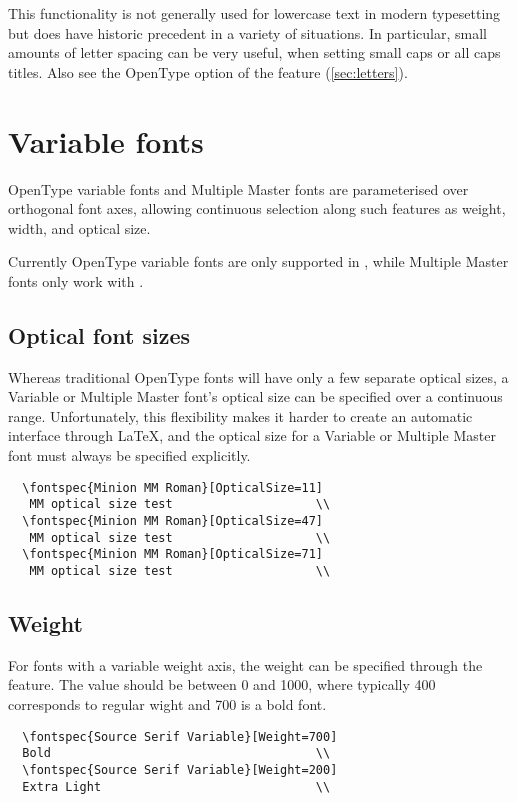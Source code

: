 \documentclass[a4paper]{l3doc}
\begin{document}
This functionality is not generally used for lowercase text in modern typesetting but does have historic precedent in a variety of situations.
In particular, small amounts of letter spacing can be very useful, when setting small caps or all caps titles.
Also see the OpenType  option of the  feature (\vref{sec:letters}).


\section{Variable fonts} \label{sec:variable}

OpenType variable fonts and Multiple Master fonts are parameterised over
orthogonal font axes, allowing continuous selection along such features
as weight, width, and optical size.

Currently OpenType variable fonts are only supported in \LuaTeX, while
Multiple Master fonts only work with \XeTeX.

\subsection{Optical font sizes} \label{sec:aat-opticalsize}
Whereas traditional OpenType fonts will have only a few separate
optical sizes, a Variable or Multiple Master font's optical size can be
specified over a continuous range. Unfortunately, this flexibility makes
it harder to create an automatic interface through \LaTeX, and the
optical size for a Variable or Multiple Master font must always be specified
explicitly.
\begin{Verbatim}
  \fontspec{Minion MM Roman}[OpticalSize=11]
   MM optical size test                    \\
  \fontspec{Minion MM Roman}[OpticalSize=47]
   MM optical size test                    \\
  \fontspec{Minion MM Roman}[OpticalSize=71]
   MM optical size test                    \\
\end{Verbatim}


\subsection{Weight} \label{sec:variable-weight}
For fonts with a variable weight axis, the weight can be specified through the
 feature. The value should be between 0 and 1000, where typically
400 corresponds to regular wight and 700 is a bold font.
\begin{Verbatim}
  \fontspec{Source Serif Variable}[Weight=700]
  Bold                                     \\
  \fontspec{Source Serif Variable}[Weight=200]
  Extra Light                              \\
\end{Verbatim}
\end{document}
